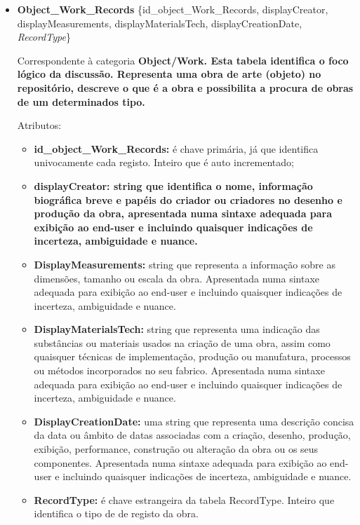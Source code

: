 \documentclass[letterpaper]{article}
\newcommand\textstyleStrongEmphasis[1]{\textbf{#1}}
\newcommand\liststyleLi{%
\renewcommand\labelitemi{{\textbullet}}
\renewcommand\labelitemii{[27A2?]}
\renewcommand\labelitemiii{{\textbullet}}
\renewcommand\labelitemiv{{\textbullet}}
}
\begin{document}
\liststyleLi
\begin{itemize}
\item {
\textbf{Object\_Work\_Records} \{id\_object\_Work\_Records,
displayCreator, displayMeasurements, displayMaterialsTech,
displayCreationDate, \textit{RecordType}\}}

\foreignlanguage{english}{Correspondente \`a categoria
}\textstyleStrongEmphasis{\foreignlanguage{english}{Object/Work}}\textstyleStrongEmphasis{\foreignlanguage{english}{\textmd{.
Esta tabela identifica o foco l\'ogico da discuss\~ao. Representa uma
obra de arte (objeto) no reposit\'orio, descreve o que \'e a obra e
possibilita a procura de obras de um determinados tipo.}}}


\bigskip

{
Atributos:}

\begin{itemize}
\item {
\textbf{id\_object\_Work\_Records:} \'e chave prim\'aria, j\'a que
identifica univocamente cada registo. Inteiro que \'e auto
incrementado;}
\item {\bfseries
displayCreator:\textmd{ }\textmd{string que identifica o nome,
informa\c{c}\~ao biogr\'afica breve e pap\'eis do criador ou criadores
no desenho e produ\c{c}\~ao da obra, apresentada numa sintaxe adequada
para exibi\c{c}\~ao ao end-user e incluindo quaisquer indica\c{c}\~oes
de incerteza, ambiguidade e nuance. }}
\item {
\textbf{DisplayMeasurements:} string que representa a informa\c{c}\~ao
sobre as dimens\~oes, tamanho ou escala da obra. Apresentada numa
sintaxe adequada para exibi\c{c}\~ao ao end-user e incluindo quaisquer
indica\c{c}\~oes de incerteza, ambiguidade e nuance.}
\item {
\textbf{DisplayMaterialsTech:} string que representa uma indica\c{c}\~ao
das subst\^ancias ou materiais usados na cria\c{c}\~ao de uma obra,
assim como quaisquer t\'ecnicas de implementa\c{c}\~ao, produ\c{c}\~ao
ou manufatura, processos ou m\'etodos incorporados no seu fabrico.
Apresentada numa sintaxe adequada para exibi\c{c}\~ao ao end-user e
incluindo quaisquer indica\c{c}\~oes de incerteza, ambiguidade e
nuance.}
\item {
\textbf{DisplayCreationDate: }uma string que representa uma
descri\c{c}\~ao concisa da data ou \^ambito de datas associadas com a
cria\c{c}\~ao, desenho, produ\c{c}\~ao, exibi\c{c}\~ao, performance,
constru\c{c}\~ao ou altera\c{c}\~ao da obra ou os seus componentes.
Apresentada numa sintaxe adequada para exibi\c{c}\~ao ao end-user e
incluindo quaisquer indica\c{c}\~oes de incerteza, ambiguidade e
nuance.}
\item {
\textbf{RecordType:} \'e chave estrangeira da tabela RecordType. Inteiro
que identifica o tipo de de registo da obra.}
\end{itemize}
\end{itemize}
\end{document}
